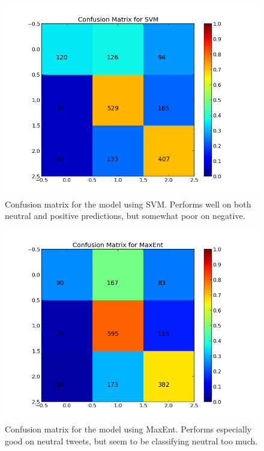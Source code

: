 \begin{minipage}[!htb]{\linewidth}
     \centering
     \begin{minipage}{0.45\linewidth}
          \begin{figure}[H]
               \includegraphics[width=\linewidth]{../img/plots/grid/confusion_matrix_SVM.png}
           \caption[Plot showing the confusion matrix for SVM]{Confusion matrix for the model using SVM. Performs well on both neutral and positive predictions, but somewhat poor on negative.}
           \label{fig:confmat_svm}
          \end{figure}
     \end{minipage}
     \hspace{0.05\linewidth}
     \begin{minipage}{0.45\linewidth}
          \begin{figure}[H]
               \includegraphics[width=\linewidth]{../img/plots/grid/confusion_matrix_MaxEnt.png}
           \caption[Plot showing the confusion matrix for MaxEnt]{Confusion matrix for the model using MaxEnt. Performs especially good on neutral tweets, but seem to be classifying neutral too much.}
           \label{fig:confmat_maxent}
          \end{figure}
     \end{minipage}
 \end{minipage}    
 
